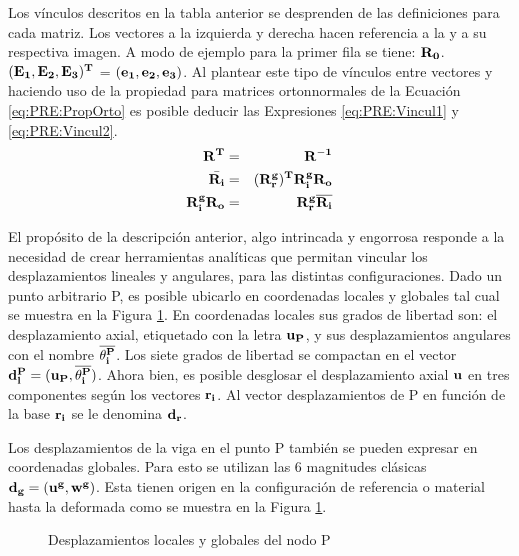 Los vínculos descritos en la tabla anterior se desprenden de las definiciones para cada matriz. Los vectores a la izquierda y derecha hacen referencia a la y a su respectiva imagen. A modo de ejemplo para la primer fila se tiene: $\bf{R}_0$. $(\bf{E_1},\bf{E_2},\bf{E_3})^T$ = $(\bf{e_1},\bf{e_2},\bf{e_3})$. Al plantear este tipo de vínculos entre vectores y haciendo uso de la propiedad para matrices ortonnormales de la Ecuación \ref{eq:PRE:PropOrto} es posible deducir las Expresiones \eqref{eq:PRE:Vincul1} y \eqref{eq:PRE:Vincul2}.
%
%
\begin{eqnarray}
		\label{eq:PRE:PropOrto}
		\bf{R}^T&=&\bf{R}^{-1}\\
		\label{eq:PRE:Vincul1}
		\bar{\bf{R_i}}&= &(\bf{R_r^g})^T\bf{R_i^g}\bf{R_o}\\
		\label{eq:PRE:Vincul2}
		\bf{R_i^g}\bf{R_o} &=& \bf{R_r^g}\overline{\bf{R_i}}
	\end{eqnarray}


El propósito de la descripción anterior, algo intrincada y engorrosa responde a la necesidad de crear herramientas analíticas que permitan vincular los
desplazamientos lineales y angulares, para las distintas configuraciones. Dado un punto arbitrario P, es posible ubicarlo en coordenadas locales y
globales tal cual se muestra en la Figura \ref{fig:PRE:IlusCorrotDisps}. En coordenadas locales sus grados de libertad son: el desplazamiento axial, etiquetado con la
letra $\bf{u_P}$, y sus desplazamientos angulares con el nombre $ \bf{\overline{\theta_i^P}}$. Los siete grados de libertad se compactan en el vector
$\bf{d}_l^P=(\bf{u_P},\bf{\overline{\theta_i^P}})$. Ahora bien, es posible desglosar el desplazamiento axial $\bf{u}$ en tres componentes según los vectores $\bf{r_i}$. Al vector desplazamientos de P en función de la base  $\bf{r_i}$ se le denomina $\bf{d_r}$.

Los desplazamientos de la viga en el punto P también se pueden expresar en
coordenadas globales.  Para esto se utilizan las 6 magnitudes clásicas 
$\bf{d_g} = (\bf{u^g},\bf{w^g})$. Esta tienen origen en la configuración
de referencia o material hasta la deformada como se muestra en la Figura
\ref{fig:PRE:IlusCorrotDisps}.

\begin{figure}[htbp]
	\centering
	\def\svgwidth{100mm}
	
	\caption{Desplazamientos locales y globales del nodo P}
	\label{fig:PRE:IlusCorrotDisps}
\end{figure}

